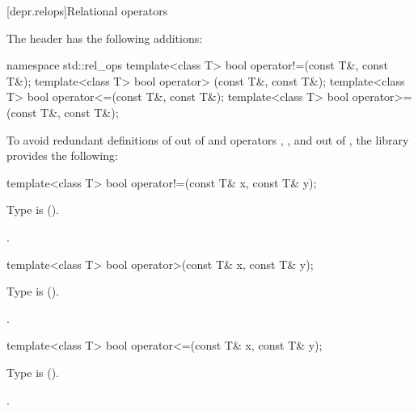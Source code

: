 %
[depr.relops]{Relational operators}

\pnum
The header  has the following additions:

\begin{codeblock}
namespace std::rel_ops {
  template<class T> bool operator!=(const T&, const T&);
  template<class T> bool operator> (const T&, const T&);
  template<class T> bool operator<=(const T&, const T&);
  template<class T> bool operator>=(const T&, const T&);
}
\end{codeblock}

\pnum
To avoid redundant definitions of  out of 
and operators \tcode{>}, \tcode{<=}, and \tcode{>=} out of ,
the library provides the following:

%
\begin{itemdecl}
template<class T> bool operator!=(const T& x, const T& y);
\end{itemdecl}

\begin{itemdescr}
\pnum
\requires
Type  is  ().

\pnum
\returns
{}.
\end{itemdescr}

%
\begin{itemdecl}
template<class T> bool operator>(const T& x, const T& y);
\end{itemdecl}

\begin{itemdescr}
\pnum
\requires
Type  is  ().

\pnum
\returns
{}.
\end{itemdescr}

%
\begin{itemdecl}
template<class T> bool operator<=(const T& x, const T& y);
\end{itemdecl}

\begin{itemdescr}
\pnum
\requires
Type  is  ().

\pnum
\returns
{}.
\end{itemdescr}

